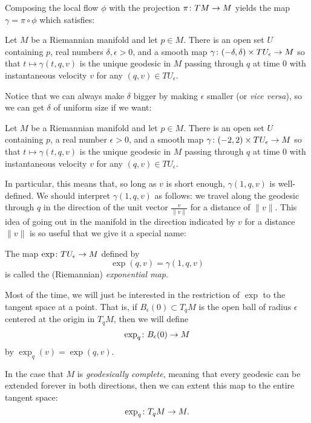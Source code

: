 Composing the local flow $\phi$ with the projection $\pi \colon\thinspace\! TM \to M$ yields the map $\gamma = \pi \circ \phi$ which satisfies:

\begin{proposition}\label{prop:geodesic flow on M}
	Let $M$ be a Riemannian manifold and let $p \in M$. There is an open set $U$ containing $p$, real numbers $\delta,\epsilon > 0$, and a smooth map $\gamma \colon\thinspace\! (-\delta, \delta) \times TU_\epsilon \to M$ so that $t \mapsto \gamma(t,q,v)$ is the unique geodesic in $M$ passing through $q$ at time 0 with instantaneous velocity $v$ for any $(q,v) \in TU_\epsilon$.
\end{proposition}

Notice that we can always make $\delta$ bigger by making $\epsilon$ smaller (or \emph{vice versa}), so we can get $\delta$ of uniform size if we want:

\begin{corollary}\label{cor:geodesic flow fixed delta}
	Let $M$ be a Riemannian manifold and let $p \in M$. There is an open set $U$ containing $p$, a real number $\epsilon > 0$, and a smooth map $\gamma \colon\thinspace\! (-2,2) \times TU_\epsilon \to M$ so that $t \mapsto \gamma(t,q,v)$ is the unique geodesic in $M$ passing through $q$ at time 0 with instantaneous velocity $v$ for any $(q,v) \in TU_\epsilon$.
\end{corollary}

In particular, this means that, so long as $v$ is short enough, $\gamma(1,q,v)$ is well-defined. We should interpret $\gamma(1,q,v)$ as follows: we travel along the geodesic through $q$ in the direction of the unit vector $\frac{v}{\|v\|}$ for a distance of $\|v\|$. This idea of going out in the manifold in the direction indicated by $v$ for a distance $\|v\|$ is so useful that we give it a special name:

\begin{definition}\label{def:Riemannian exponential}
	The map $\exp \colon\thinspace\! TU_\epsilon \to M$ defined by
	\[
		\exp(q,v) = \gamma(1,q,v)
	\]
	is called the (Riemannian) \emph{exponential map}.
\end{definition}

Most of the time, we will just be interested in the restriction of $\exp$ to the tangent space at a point. That is, if $B_\epsilon(0) \subset T_q M$ is the open ball of radius $\epsilon$ centered at the origin in $T_qM$, then we will define
\[
	\exp_q \colon\thinspace\! B_\epsilon(0) \to M
\]
by $\exp_q(v) = \exp(q,v)$.

In the case that $M$ is \emph{geodesically complete}, meaning that every geodesic can be extended forever in both directions, then we can extent this map to the entire tangent space:
\[
	\exp_q \colon\thinspace\! T_q M \to M.
\]

